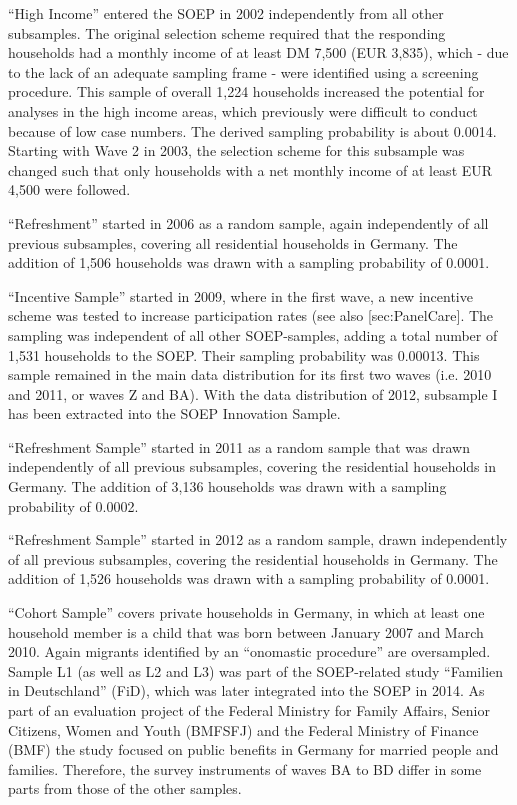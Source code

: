 \documentclass[letterpaper,10pt,openany,onesideH,english]{sphinxmanual}
\begin{document}
 “High Income” entered the SOEP in 2002 independently from all other subsamples. The original selection scheme required that the responding households had a monthly income of at least DM 7,500 (EUR 3,835), which - due to the lack of an adequate sampling frame - were identified using a screening procedure. This sample of overall 1,224 households increased the potential for analyses in the high income areas, which previously were difficult to conduct because of low case numbers. The derived sampling probability is about 0.0014. Starting with Wave 2 in 2003, the selection scheme for this subsample was changed such that only households with a net monthly income of at least EUR 4,500 were followed.

 “Refreshment” started in 2006 as a random sample, again independently of all previous subsamples, covering all residential households in Germany. The addition of 1,506 households was drawn with a sampling probability of 0.0001.

 “Incentive Sample” started in 2009, where in the first wave, a new incentive scheme was tested to increase participation rates (see also {[}sec:PanelCare{]}. The sampling was independent of all other SOEP-samples, adding a total number of 1,531 households to the SOEP. Their sampling probability was 0.00013. This sample remained in the main data distribution for its first two waves (i.e. 2010 and 2011, or waves Z and BA). With the data distribution of 2012, subsample I has been extracted into the SOEP Innovation Sample.

 “Refreshment Sample” started in 2011 as a random sample that was drawn independently of all previous subsamples, covering the residential households in Germany. The addition of 3,136 households was drawn with a sampling probability of 0.0002.

 “Refreshment Sample” started in 2012 as a random sample, drawn independently of all previous subsamples, covering the residential households in Germany. The addition of 1,526 households was drawn with a sampling probability of 0.0001.

 “Cohort Sample” covers private households in Germany, in which at least one household member is a child that was born between January 2007 and March 2010. Again migrants identified by an “onomastic procedure” are oversampled. Sample L1 (as well as L2 and L3) was part of the SOEP-related study “Familien in Deutschland” (FiD), which was later integrated into the SOEP in 2014. As part of an evaluation project of the Federal Ministry for Family Affairs, Senior Citizens, Women and Youth (BMFSFJ) and the Federal Ministry of Finance (BMF) the study focused on public benefits in Germany for married people and families. Therefore, the survey instruments of waves BA to BD differ in some parts from those of the other samples.
\end{document}
